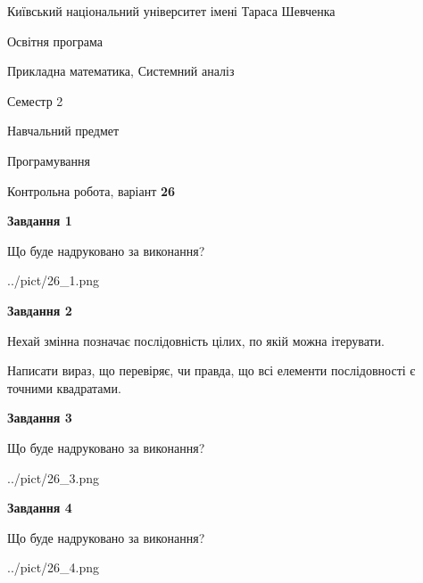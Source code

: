 \documentclass[12pt, ukrainian]{article}
\begin{document}
{{\begin {small}\par
{ \center  Київський національний університет імені Тараса Шевченка \par}
{\parbox {5 cm}{Освітня програма \hfill}{\parbox {8 cm}{Прикладна математика, Системний аналіз \hfill}}\parbox {5 cm}{\hfill Семестр 2}}\par
{\parbox {5 cm} {Навчальний предмет \hfill}\parbox {7 cm}{Програмування \hfill}\parbox {6cm}{\hfill}\par}\vspace{-7pt} \end{small}}{\center Контрольна робота, варіант  \No \textbf
{ 26 }\par}}
{
\begin {large}
{\begin {center}\textbf{Завдання 1}\end {center}}\par
Що буде надруковано за виконання?\par\par
\begin{center}
	{../pict/26_1.png}
\end{center}
\newpage

{\begin {center}\textbf{Завдання 2}\end {center}}\par
Нехай змінна  позначає послідовність цілих, по якій можна ітерувати.

Написати вираз, що перевіряє, чи правда, що всі елементи послідовності є точними квадратами.\par
\newpage

{\begin {center}\textbf{Завдання 3}\end {center}}\par
Що буде надруковано за виконання?\par
\begin{center}
	{../pict/26_3.png}
\end{center}
\newpage

{\begin {center}\textbf{Завдання 4}\end {center}}\par
Що буде надруковано за виконання?\par
\begin{center}
	{../pict/26_4.png}
\end{center}
\newpage


\end{large}}
\end{document}
